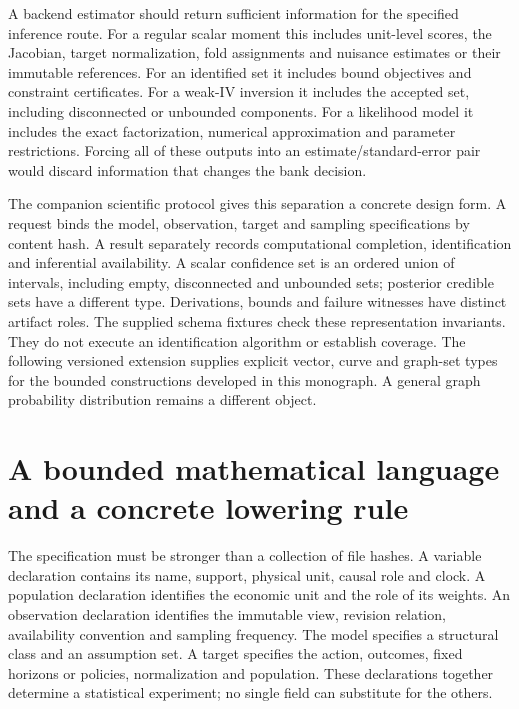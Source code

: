 A backend estimator should return sufficient information for the
specified inference route. For a regular scalar moment this includes
unit-level scores, the Jacobian, target normalization, fold assignments
and nuisance estimates or their immutable references. For an identified
set it includes bound objectives and constraint certificates. For a
weak-IV inversion it includes the accepted set, including disconnected
or unbounded components. For a likelihood model it includes the exact
factorization, numerical approximation and parameter restrictions.
Forcing all of these outputs into an estimate/standard-error pair would
discard information that changes the bank decision.

\label{r3:protocol}
The companion scientific protocol gives this separation a concrete design
form. A request binds the model, observation, target and sampling
specifications by content hash. A result separately records computational
completion, identification and inferential availability. A scalar
confidence set is an ordered union of intervals, including empty,
disconnected and unbounded sets; posterior credible sets have a different
type. Derivations, bounds and failure witnesses have distinct artifact
roles. The supplied schema fixtures check these representation invariants.
They do not execute an identification algorithm or establish coverage.
The following versioned extension supplies explicit vector, curve and graph-set
types for the bounded constructions developed in this monograph. A general
graph probability distribution remains a different object.



\section{A bounded mathematical language and a concrete lowering rule}
\label{s4:scientific-language}
The specification must be stronger than a collection of file hashes. A
variable declaration contains its name, support, physical unit, causal role
and clock. A population declaration identifies the economic unit and the
role of its weights. An observation declaration identifies the immutable
view, revision relation, availability convention and sampling frequency.
The model specifies a structural class and an assumption set. A target
specifies the action, outcomes, fixed horizons or policies, normalization
and population. These declarations together determine a statistical
experiment; no single field can substitute for the others.

